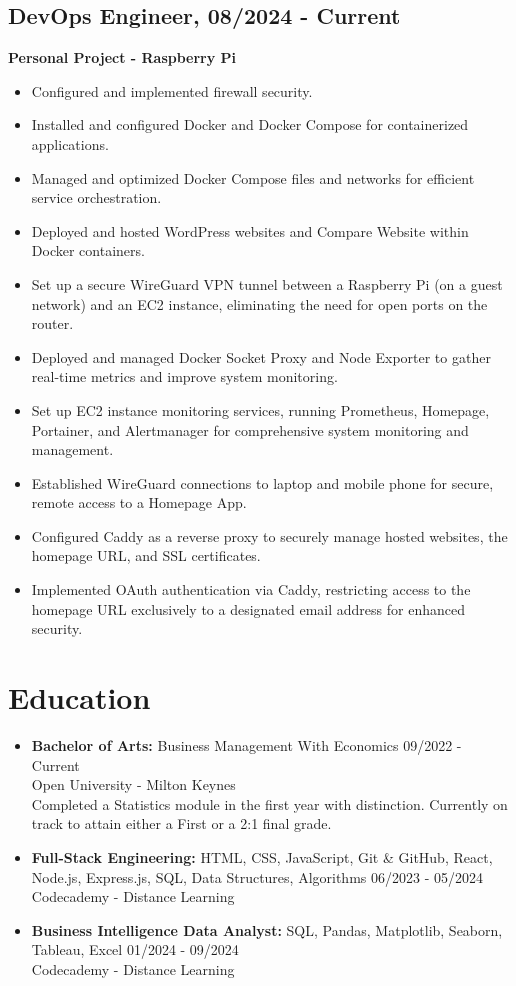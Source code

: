 \documentclass[a4paper,10pt]{article}
\begin{document}
\subsection*{DevOps Engineer, 08/2024 - Current}
\textbf{Personal Project - Raspberry Pi}
\begin{itemize}
    \item Configured and implemented firewall security.
    \item Installed and configured Docker and Docker Compose for containerized applications.
    \item Managed and optimized Docker Compose files and networks for efficient service orchestration.
    \item Deployed and hosted WordPress websites and Compare Website within Docker containers.
    \item Set up a secure WireGuard VPN tunnel between a Raspberry Pi (on a guest network) and an EC2 instance, eliminating the need for open ports on the router.
    \item Deployed and managed Docker Socket Proxy and Node Exporter to gather real-time metrics and improve system monitoring.
    \item Set up EC2 instance monitoring services, running Prometheus, Homepage, Portainer, and Alertmanager for comprehensive system monitoring and management.
    \item Established WireGuard connections to laptop and mobile phone for secure, remote access to a Homepage App.
    \item Configured Caddy as a reverse proxy to securely manage hosted websites, the homepage URL, and SSL certificates.
    \item Implemented OAuth authentication via Caddy, restricting access to the homepage URL exclusively to a designated email address for enhanced security.
\end{itemize}

\section*{Education}
\begin{itemize}[leftmargin=*]
    \item \textbf{Bachelor of Arts: } Business Management With Economics \hfill 09/2022 - Current \\
    Open University - Milton Keynes \\
    Completed a Statistics module in the first year with distinction. Currently on track to attain either a First or a 2:1 final grade.
    \item \textbf{Full-Stack Engineering: } HTML, CSS, JavaScript, Git \& GitHub, React, Node.js, Express.js, SQL, Data Structures, Algorithms \hfill 06/2023 - 05/2024 \\
    Codecademy - Distance Learning
    \item \textbf{Business Intelligence Data Analyst: } SQL, Pandas, Matplotlib, Seaborn, Tableau, Excel \hfill 01/2024 - 09/2024 \\
    Codecademy - Distance Learning
\end{itemize}
\end{document}

